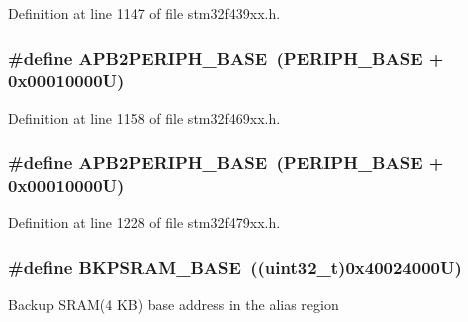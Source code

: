 Definition at line 1147 of file stm32f439xx.\+h.

\subsubsection[{\texorpdfstring{A\+P\+B2\+P\+E\+R\+I\+P\+H\+\_\+\+B\+A\+SE}{APB2PERIPH_BASE}}]{\setlength{\rightskip}{0pt plus 5cm}\#define A\+P\+B2\+P\+E\+R\+I\+P\+H\+\_\+\+B\+A\+SE~({\bf P\+E\+R\+I\+P\+H\+\_\+\+B\+A\+SE} + 0x00010000\+U)}\hypertarget{group___peripheral__memory__map_ga25b99d6065f1c8f751e78f43ade652cb}{}\label{group___peripheral__memory__map_ga25b99d6065f1c8f751e78f43ade652cb}


Definition at line 1158 of file stm32f469xx.\+h.

\subsubsection[{\texorpdfstring{A\+P\+B2\+P\+E\+R\+I\+P\+H\+\_\+\+B\+A\+SE}{APB2PERIPH_BASE}}]{\setlength{\rightskip}{0pt plus 5cm}\#define A\+P\+B2\+P\+E\+R\+I\+P\+H\+\_\+\+B\+A\+SE~({\bf P\+E\+R\+I\+P\+H\+\_\+\+B\+A\+SE} + 0x00010000\+U)}\hypertarget{group___peripheral__memory__map_ga25b99d6065f1c8f751e78f43ade652cb}{}\label{group___peripheral__memory__map_ga25b99d6065f1c8f751e78f43ade652cb}


Definition at line 1228 of file stm32f479xx.\+h.

\subsubsection[{\texorpdfstring{B\+K\+P\+S\+R\+A\+M\+\_\+\+B\+A\+SE}{BKPSRAM_BASE}}]{\setlength{\rightskip}{0pt plus 5cm}\#define B\+K\+P\+S\+R\+A\+M\+\_\+\+B\+A\+SE~((uint32\+\_\+t)0x40024000\+U)}\hypertarget{group___peripheral__memory__map_ga52e57051bdf8909222b36e5408a48f32}{}\label{group___peripheral__memory__map_ga52e57051bdf8909222b36e5408a48f32}
Backup S\+R\+A\+M(4 K\+B) base address in the alias region 

